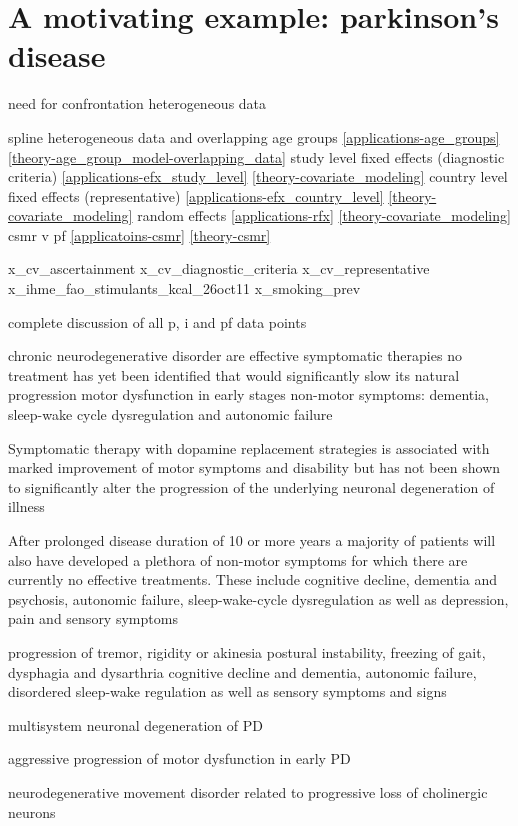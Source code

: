 \section{A motivating example: parkinson's disease}
\label{intro-complete_ex}

need for confrontation
heterogeneous data

spline
heterogeneous data and overlapping age groups \ref{applications-age_groups} \ref{theory-age_group_model-overlapping_data}
study level fixed effects (diagnostic criteria) \ref{applications-efx_study_level} \ref{theory-covariate_modeling}
country level fixed effects (representative) \ref{applications-efx_country_level} \ref{theory-covariate_modeling}
random effects \ref{applications-rfx} \ref{theory-covariate_modeling}
csmr v pf \ref{applicatoins-csmr} \ref{theory-csmr}

x_cv_ascertainment
x_cv_diagnostic_criteria
x_cv_representative
x_ihme_fao_stimulants_kcal_26oct11
x_smoking_prev

complete discussion of all p, i and pf data points

chronic neurodegenerative disorder
are effective symptomatic therapies
no treatment has yet been identified that would significantly slow its natural progression
motor dysfunction in early stages
non-motor symptoms: dementia, sleep-wake cycle dysregulation and autonomic failure

Symptomatic therapy with dopamine replacement strategies is associated with marked improvement of motor symptoms and disability but has not been shown to significantly alter
the progression of the underlying neuronal degeneration of illness

After prolonged disease duration of 10 or more years a majority of patients will
also have developed a plethora of non-motor symptoms for which there are currently no effective treatments. These include cognitive decline, dementia and psychosis, autonomic failure, sleep-wake-cycle dysregulation as well as depression, pain and sensory symptoms

progression of tremor, rigidity or akinesia
postural instability, freezing of gait, dysphagia and dysarthria
cognitive decline and dementia, autonomic failure, disordered sleep-wake regulation as
well as sensory symptoms and signs

multisystem neuronal degeneration of PD

aggressive progression of motor dysfunction in early PD

neurodegenerative movement disorder related to progressive loss of cholinergic neurons

